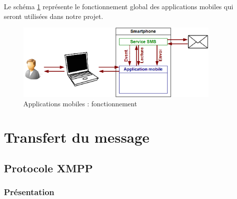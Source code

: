 Le schéma \ref{schemaFonctionnement_applicationMobile} représente le fonctionnement global des applications mobiles qui seront utilisées dans notre projet.
\begin{figure}[!h]
	\center
	\includegraphics[width=0.9\textwidth]{img/schemaFonctionnement_applicationMobile.png}
	\caption{Applications mobiles : fonctionnement}
	\label{schemaFonctionnement_applicationMobile}
\end{figure}






\section{Transfert du message}


\subsection{Protocole XMPP}


\subsubsection{Présentation}

